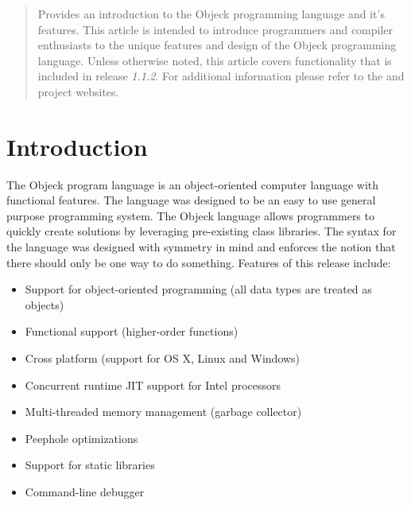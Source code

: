 \documentclass[12pt]{article}
\begin{document}
\maketitle
\thispagestyle{empty}

\vspace{\baselineskip}

\begin{abstract}
Provides an introduction to the Objeck programming language and it's features.  This article is intended to introduce programmers and compiler enthusiasts to the unique features and design of the Objeck programming language.   Unless otherwise noted, this article covers functionality that is included in release \textit{1.1.2}.  For additional information please refer to the  and  project websites.
\end{abstract}

\newpage
\tableofcontents
\newpage

\label{Introduction}
\section{Introduction}
The Objeck program language is an object-oriented computer language with functional features.  The language was designed to be an easy to use general purpose programming system.  The Objeck language allows programmers to quickly create solutions by leveraging pre-existing class libraries.  The syntax for the language was designed with symmetry in mind and enforces the notion that there should only be one way to do something. Features of this release include:
\begin{itemize}
	\item Support for object-oriented programming (all data types are treated as objects)
	\item Functional support (higher-order functions) 
	\item Cross platform (support for OS X, Linux and Windows)
	\item Concurrent runtime JIT support for Intel processors
	\item Multi-threaded memory management (garbage collector)
	\item Peephole optimizations
	\item Support for static libraries
	\item Command-line debugger
\end{itemize}
\end{document}
